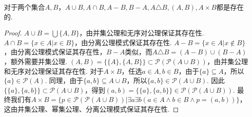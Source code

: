 \documentclass[main.tex]{subfiles}
\begin{document}
\begin{theorem}{}
    对于两个集合\(A,B\)，\(A \cup B, A \cap B, A-B, B-A, A \triangle B, (A,B), A \times B\)都是存在的.
\end{theorem}
\begin{proof}
    \(A \cup B = \bigcup\{A,B\}\)，由并集公理和无序对公理保证其存在性.
    \newline
    \(A \cap B = \{x \in A|x \in B\}\)，由分离公理模式保证其存在性.
    \newline
    \(A-B = \{x \in A | x \not \in B\}\)，由分离公理模式保证其存在性，\(B-A\)类似，而\(A \triangle B = (A-B) \cup (B-A)\)，额外需要并集公理.
    \newline
    \((A,B) = \{\{A\},\{A,B\}\} \subset \mathcal{P}(\mathcal{P}(A \cup B))\)，由并集公理和无序对公理保证其存在性.
    \newline
    对于\(A \times B\)，任选\(a \in A, b \in B\)，由于\(\{a\} \subseteq A\)，所以\(\{a\} \in \mathcal{P}(A)\). 同理，由于\(\{a,b\} \subseteq A\cup B\)，所以\(\{a,b\} \in \mathcal{P}(A \cup B)\). 因此\(\{\{a\},\{a,b\}\} \subset \mathcal{P}(A \cup B)\)，得到\((a,b) = \{\{a\},\{a,b\}\} \in \mathcal{P}(\mathcal{P}(A \cup B))\). 最终我们有\(A \times B = \{p\in \mathcal{P}(\mathcal{P}(A \cup B))|\exists a \exists b(a \in A \wedge b \in B \wedge p = (a,b))\}\)，这由并集公理、幂集公理、分离公理模式保证其存在性.
\end{proof}


\end{document}

